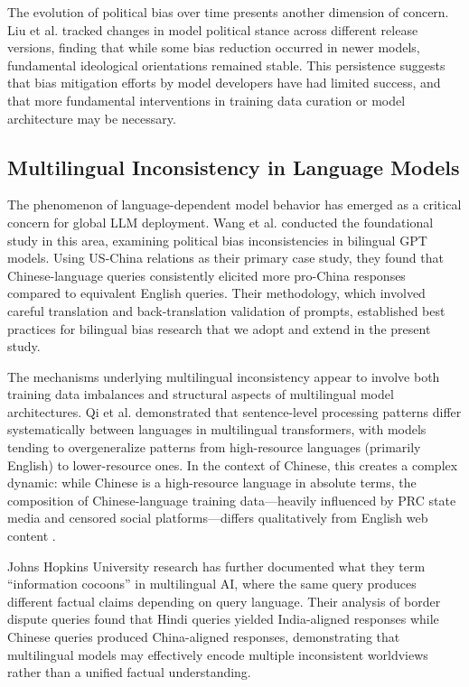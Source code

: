 \documentclass[11pt,a4paper]{article}
\begin{document}
The evolution of political bias over time presents another dimension of concern. Liu et al. \citep{liu2024temporal} tracked changes in model political stance across different release versions, finding that while some bias reduction occurred in newer models, fundamental ideological orientations remained stable. This persistence suggests that bias mitigation efforts by model developers have had limited success, and that more fundamental interventions in training data curation or model architecture may be necessary.

\subsection{Multilingual Inconsistency in Language Models}

The phenomenon of language-dependent model behavior has emerged as a critical concern for global LLM deployment. Wang et al. \citep{wang2024nyu} conducted the foundational study in this area, examining political bias inconsistencies in bilingual GPT models. Using US-China relations as their primary case study, they found that Chinese-language queries consistently elicited more pro-China responses compared to equivalent English queries. Their methodology, which involved careful translation and back-translation validation of prompts, established best practices for bilingual bias research that we adopt and extend in the present study.

The mechanisms underlying multilingual inconsistency appear to involve both training data imbalances and structural aspects of multilingual model architectures. Qi et al. \citep{qi2023crosslingual} demonstrated that sentence-level processing patterns differ systematically between languages in multilingual transformers, with models tending to overgeneralize patterns from high-resource languages (primarily English) to lower-resource ones. In the context of Chinese, this creates a complex dynamic: while Chinese is a high-resource language in absolute terms, the composition of Chinese-language training data---heavily influenced by PRC state media and censored social platforms---differs qualitatively from English web content \citep{xu2024censorship}.

Johns Hopkins University research \citep{jhu2025multilingual} has further documented what they term ``information cocoons'' in multilingual AI, where the same query produces different factual claims depending on query language. Their analysis of border dispute queries found that Hindi queries yielded India-aligned responses while Chinese queries produced China-aligned responses, demonstrating that multilingual models may effectively encode multiple inconsistent worldviews rather than a unified factual understanding.
\end{document}
